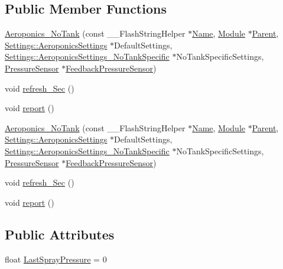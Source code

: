 \subsection*{Public Member Functions}
\begin{DoxyCompactItemize}
\item 
\hyperlink{class_aeroponics___no_tank_aa46529f5e83970d7579a7d524ea65ab7}{Aeroponics\+\_\+\+No\+Tank} (const \+\_\+\+\_\+\+Flash\+String\+Helper $\ast$\hyperlink{class_common_aeea91a726dbe988e515057b32ba0726f}{Name}, \hyperlink{class_module}{Module} $\ast$\hyperlink{class_aeroponics_aa6bca341181caaa3ef15d10512d24c7b}{Parent}, \hyperlink{struct_settings_1_1_aeroponics_settings}{Settings\+::\+Aeroponics\+Settings} $\ast$Default\+Settings, \hyperlink{struct_settings_1_1_aeroponics_settings___no_tank_specific}{Settings\+::\+Aeroponics\+Settings\+\_\+\+No\+Tank\+Specific} $\ast$No\+Tank\+Specific\+Settings, \hyperlink{class_pressure_sensor}{Pressure\+Sensor} $\ast$\hyperlink{class_aeroponics_ab5e9a2fe86a36e1e84876eb1366a2bfb}{Feedback\+Pressure\+Sensor})
\item 
void \hyperlink{class_aeroponics___no_tank_a8e0130107832f0a60d37ea581f6f67fb}{refresh\+\_\+\+Sec} ()
\item 
void \hyperlink{class_aeroponics___no_tank_af2f6dfdcfd4365ed35aa83176113ff86}{report} ()
\item 
\hyperlink{class_aeroponics___no_tank_aa46529f5e83970d7579a7d524ea65ab7}{Aeroponics\+\_\+\+No\+Tank} (const \+\_\+\+\_\+\+Flash\+String\+Helper $\ast$\hyperlink{class_common_aeea91a726dbe988e515057b32ba0726f}{Name}, \hyperlink{class_module}{Module} $\ast$\hyperlink{class_aeroponics_aa6bca341181caaa3ef15d10512d24c7b}{Parent}, \hyperlink{struct_settings_1_1_aeroponics_settings}{Settings\+::\+Aeroponics\+Settings} $\ast$Default\+Settings, \hyperlink{struct_settings_1_1_aeroponics_settings___no_tank_specific}{Settings\+::\+Aeroponics\+Settings\+\_\+\+No\+Tank\+Specific} $\ast$No\+Tank\+Specific\+Settings, \hyperlink{class_pressure_sensor}{Pressure\+Sensor} $\ast$\hyperlink{class_aeroponics_ab5e9a2fe86a36e1e84876eb1366a2bfb}{Feedback\+Pressure\+Sensor})
\item 
void \hyperlink{class_aeroponics___no_tank_a8e0130107832f0a60d37ea581f6f67fb}{refresh\+\_\+\+Sec} ()
\item 
void \hyperlink{class_aeroponics___no_tank_af2f6dfdcfd4365ed35aa83176113ff86}{report} ()
\end{DoxyCompactItemize}
\subsection*{Public Attributes}
\begin{DoxyCompactItemize}
\item 
float \hyperlink{class_aeroponics___no_tank_aeb5716169a0496dd832626aa67160da9}{Last\+Spray\+Pressure} = 0
\end{DoxyCompactItemize}
